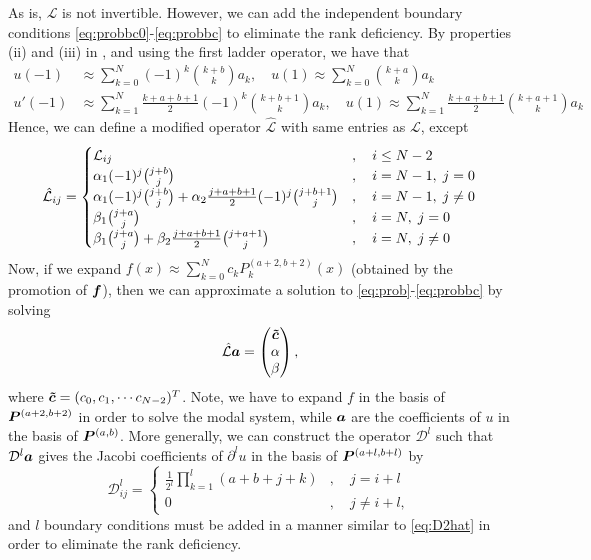 As is, $\mathcal{L}$ is not invertible. However, we can add the independent boundary conditions \eqref{eq:probbc0}-\eqref{eq:probbc} to eliminate the rank deficiency. By properties (ii) and (iii) in , and using the first ladder operator, we have that 
\begin{equation}
\begin{split}
u(-1) &\approx \sum_{k=0}^N (-1)^k {k+b \choose k} a_k,\quad u(1) \approx \sum_{k=0}^N {k+a \choose k}a_k \\
u'(-1) &\approx \sum_{k=1}^N \frac{k+a+b+1}{2}(-1)^k{k+b+1\choose k} a_k,\quad u(1) \approx \sum_{k=1}^N \frac{k+a+b+1}{2}{k+a+1\choose k}a_k
\end{split}
\end{equation}
Hence, we can define a modified operator $\hat{\mathcal{L}}$ with same entries as $\mathcal{L}$, except
\begin{equation}\label{eq:D2hat}
\hat{\mathcal{L}}_{ij} = 
\begin{cases} \mathcal{L}_{ij}&,\quad i \leq N-2\\
\alpha_1(-1)^j{j+b\choose j}&,\quad i = N-1,\; j = 0\\
\alpha_1(-1)^j{j+b\choose j} + \alpha_2 \frac{j+a+b+1}{2}(-1)^j{j+b+1\choose j}&,\quad i = N-1,\; j\neq 0\\
\beta_1{j+a\choose j}&,\quad i=N,\; j = 0\\
\beta_1{j+a\choose j} + \beta_2 \frac{j+a+b+1}{2}{j+a+1\choose j}&,\quad i = N,\; j \neq 0
\end{cases}
\end{equation}
Now, if we expand $f(x) \approx \sum_{k=0}^N c_k P_k^{(a+2,b+2)}(x)$ (obtained by the promotion of $\boldsymbol{f}$), then we can approximate a solution to \eqref{eq:prob}-\eqref{eq:probbc} by solving
\begin{equation}\label{eq:discrete}
	\hat{\mathcal{L}}\boldsymbol{a} = \begin{pmatrix} \boldsymbol{\tilde{c}}\\\alpha\\\beta\end{pmatrix},
\end{equation}  
where $\boldsymbol{\tilde{c}} = (c_0,c_1,\cdots c_{N-2})^T$. \color{purple} Note, we have to expand $f$ in the basis of $\boldsymbol{P}^{(a+2,b+2)}$ in order to solve the modal system, while $\boldsymbol{a}$ are the coefficients of $u$ in the basis of $\boldsymbol{P}^{(a,b)}$. \color{black}  More generally, we can construct the operator $\mathcal{D}^l$ such that $\mathcal{D}^l\boldsymbol{a}$ gives the Jacobi coefficients of $\partial^l u$ in the basis of $\boldsymbol{P}^{(a+l,b+l)}$ by
\begin{equation}\label{eq:Dl}
\mathcal{D}^l_{ij} = 
\begin{cases}
\frac{1}{2^l}\prod_{k=1}^l(a+b+j+k)&,\quad j=i+l\\
0&,\quad j \neq i + l,
\end{cases}
\end{equation}
and $l$ boundary conditions must be added in a manner similar to \eqref{eq:D2hat} in order to eliminate the rank deficiency.

